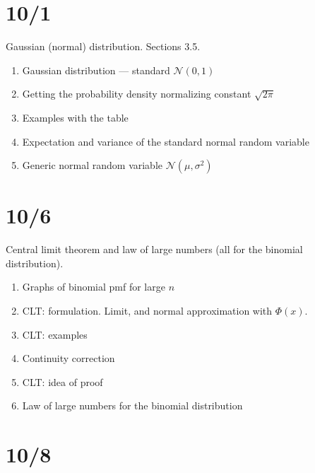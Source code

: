 \documentclass[letterpaper,11pt,oneside,reqno]{amsart}
\numberwithin{equation}{section}
\theoremstyle{definition}
\begin{document}
\section{10/1}

Gaussian (normal) distribution. Sections 3.5.
\begin{enumerate}
	\item Gaussian distribution --- standard $\mathcal{N}(0,1)$
	\item Getting the probability density normalizing constant $\sqrt{2\pi}$
	\item Examples with the table
	\item Expectation and variance of the standard normal random variable
	\item Generic normal random variable $\mathcal{N}(\mu,\sigma^2)$
\end{enumerate}

\section{10/6}

Central limit theorem and law of large numbers (all for the binomial distribution).

\begin{enumerate}
	\item Graphs of binomial pmf for large $n$
	\item CLT: formulation. Limit, and normal approximation with $\Phi(x)$.
	\item CLT: examples
	\item Continuity correction
	\item CLT: idea of proof
	\item Law of large numbers for the binomial distribution
\end{enumerate}

\section{10/8}
\end{document}
